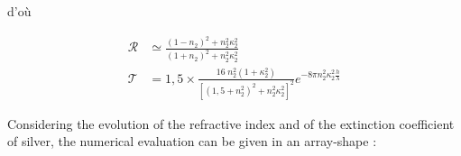 d'où

\begin{align}
  \mathcal{R} &\simeq \frac{(1-n_2)^2 + n_2^2\kappa_2^2}{(1+n_2)^2 + n_2^2\kappa_2^2}\\
  \mathcal{T} &= 1,5\times\frac{16\;n_2^2(1+\kappa_2^2)}{\left[(1,5+n_2^2)^2 + n_2^2\kappa_2^2\right]^2}e^{-8\pi n_2^2 \kappa_2^2 \frac{h}{\lambda}}
\end{align}

Considering the evolution of the refractive index and of the extinction coefficient of silver, the numerical evaluation can be given in an array-shape :